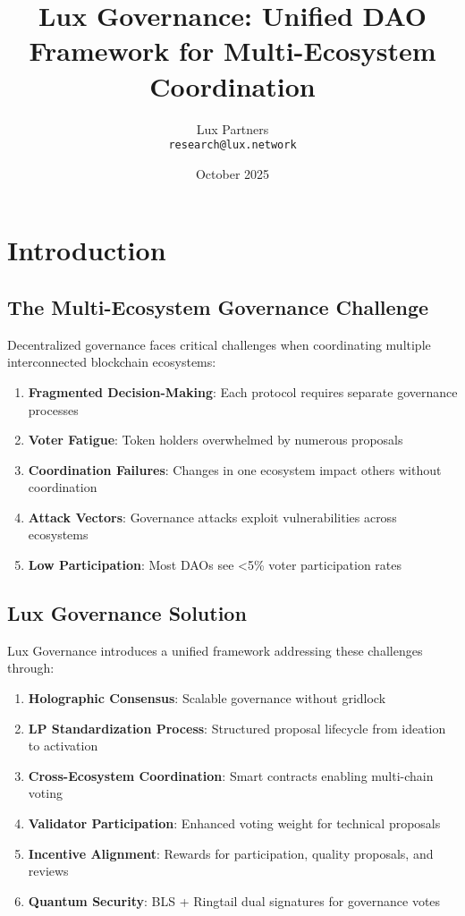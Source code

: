 \documentclass[11pt,a4paper]{article}
\title{Lux Governance: Unified DAO Framework for Multi-Ecosystem Coordination}
\author{
Lux Partners\\
\texttt{research@lux.network}
}
\date{October 2025}
\begin{document}
\maketitle

\section{Introduction}

\subsection{The Multi-Ecosystem Governance Challenge}

Decentralized governance faces critical challenges when coordinating multiple interconnected blockchain ecosystems:

\begin{enumerate}
\item \textbf{Fragmented Decision-Making}: Each protocol requires separate governance processes
\item \textbf{Voter Fatigue}: Token holders overwhelmed by numerous proposals
\item \textbf{Coordination Failures}: Changes in one ecosystem impact others without coordination
\item \textbf{Attack Vectors}: Governance attacks exploit vulnerabilities across ecosystems
\item \textbf{Low Participation}: Most DAOs see <5\% voter participation rates
\end{enumerate}

\subsection{Lux Governance Solution}

Lux Governance introduces a unified framework addressing these challenges through:

\begin{enumerate}
\item \textbf{Holographic Consensus}: Scalable governance without gridlock
\item \textbf{LP Standardization Process}: Structured proposal lifecycle from ideation to activation
\item \textbf{Cross-Ecosystem Coordination}: Smart contracts enabling multi-chain voting
\item \textbf{Validator Participation}: Enhanced voting weight for technical proposals
\item \textbf{Incentive Alignment}: Rewards for participation, quality proposals, and reviews
\item \textbf{Quantum Security}: BLS + Ringtail dual signatures for governance votes
\end{enumerate}
\end{document}
